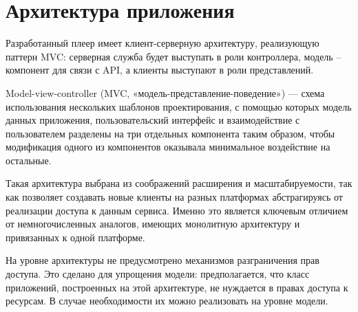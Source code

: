 \section{Архитектура приложения}

Разработанный плеер имеет клиент-серверную архитектуру, реализующую
паттерн MVC: серверная служба будет выступать в роли
контроллера, модель -- компонент для связи с API, а клиенты выступают в роли
представлений. 

Model-view-controller (MVC, «модель-представление-поведение») --- схема
использования нескольких шаблонов проектирования, с помощью которых
модель данных приложения, пользовательский интерфейс и взаимодействие
с пользователем разделены на три отдельных компонента таким образом,
чтобы модификация одного из компонентов оказывала минимальное
воздействие на остальные.\cite{wiki:mvc}

Такая архитектура выбрана из соображений расширения и
масштабируемости, так как позволяет создавать новые клиенты на разных
платформах абстрагируясь от реализации доступа к данным
сервиса. Именно это является ключевым отличием от немногочисленных
аналогов, имеющих монолитную архитектуру и привязанных к одной
платформе.


На уровне архитектуры не предусмотрено механизмов разграничения прав доступа. Это
сделано для упрощения модели: предполагается, что класс приложений,
построенных на этой архитектуре, не нуждается в правах доступа к
ресурсам. В случае необходимости их можно реализовать на уровне
модели.









